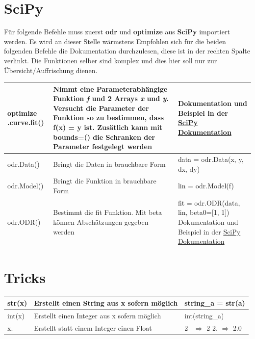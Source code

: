 \documentclass[a4paper,12pt]{article}
\begin{document}
\newpage

\section*{SciPy}  

Für folgende Befehle muss zuerst \textbf{odr} und \textbf{optimize} aus \textbf{SciPy} importiert werden.
\newline
Es wird an dieser Stelle wärmstens Empfohlen sich für die beiden folgenden Befehle die Dokumentation durchzulesen, diese ist in der rechten Spalte verlinkt. Die Funktionen selber sind komplex und dies hier soll nur zur Übersicht/Auffrischung dienen.

\begin{center}
\begin{tabular}{|p{3cm}|p{8cm}|p{3cm}|}
\hline
optimize .curve.fit() & Nimmt eine Parameterabhängige Funktion \textit{f} und 2 Arrays \textit{x} und \textit{y}. Versucht die Parameter der Funktion so zu bestimmen, dass f(x) = y ist. Zusätlich kann mit \textbf{bounds=()} die Schranken der Parameter festgelegt werden& Dokumentation und Beispiel in der \href{https://docs.scipy.org/doc/scipy/reference/generated/scipy.optimize.curve_fit.html}{SciPy Dokumentation} \\
\hline
odr.Data() & Bringt die Daten in brauchbare Form & data = odr.Data(x, y, dx, dy) \\
\hline
odr.Model() & Bringt die Funktion in brauchbare Form & lin = odr.Model(f) \\
\hline
odr.ODR() & Bestimmt die fit Funktion. Mit beta können Abschätzungen gegeben werden & fit = odr.ODR(data, lin, beta0=[1, 1]) \newline \newline
Dokumentation und Beispiel in der \href{https://docs.scipy.org/doc/scipy/reference/odr.html}{SciPy Dokumentation} \\
\hline
\end{tabular}
\end{center}

\section*{Tricks} 

\begin{center}
\begin{tabular}{|p{3cm}|p{8cm}|p{3cm}|}
\hline
str(x) & Erstellt einen String aus x sofern möglich & string\_a = str(a) \\
\hline
int(x) & Erstellt einen Integer aus x sofern möglich & int(string\_a) \\
\hline
x. & Erstellt statt einem Integer einen Float & 
2 \  $\Rightarrow$ 2 \newline{} 2. $\Rightarrow$ 2.0
\\
\hline
\end{tabular}
\end{center}
\end{document}
